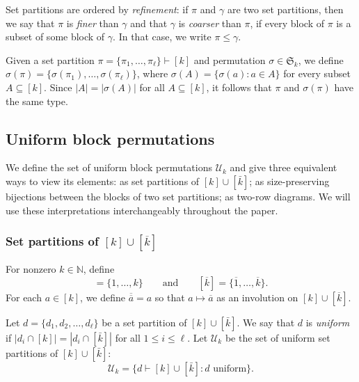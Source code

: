 \documentclass[ALCO,Unicode]{cedram}
\newcommand{\defncolor}{\color{darkred}}
\newcommand{\defn}[1]{{\defncolor\emph{#1}}} %
\begin{document}
Set partitions are ordered by \defn{refinement}: if $\pi$ and $\gamma$ are two set partitions, then we say that $\pi$ is \defn{finer}
than $\gamma$ and that $\gamma$ is \defn{coarser} than $\pi$, if every block of $\pi$ is a subset of some block of $\gamma$. In that case,
we write $\pi\leqslant \gamma$.

Given a set partition $\pi = \{\pi_1, \ldots, \pi_\ell\} \vdash [k]$
and permutation $\sigma \in \mathfrak{S}_k$, we define
$\sigma(\pi) = \{\sigma(\pi_1), \ldots, \sigma(\pi_\ell)\}$,
where $\sigma(A) = \{\sigma(a) : a\in A\}$ for every subset $A \subseteq [k]$.
Since $|A| = |\sigma(A)|$ for all $A \subseteq [k]$, it follows that
$\pi$ and $\sigma(\pi)$ have the same type.

\subsection{Uniform block permutations}
\label{section.UBP}

We define the set of uniform block permutations $\mathcal{U}_k$ and give
three equivalent ways to view its elements:
as set partitions of $[k]\cup [\bar{k}]$;
as size-preserving bijections between the blocks of two set partitions;
as two-row diagrams.
We will use these interpretations interchangeably throughout the paper.

\subsubsection{Set partitions of $[k] \cup [\overline{k}]$}
For nonzero $k\in \mathbb{N}$, define
\begin{equation*}
    [k]= \{1, \dots, k\}
    \qquad\text{and}\qquad
    [\overline{k}] = \{\overline{1}, \ldots, \overline{k}\}.
\end{equation*}
For each $a \in [k]$, we define $\overline{\overline{a}} = a$ so that
$a \mapsto \overline{a}$ as an involution on $[k] \cup [\overline{k}]$.

Let $d = \{d_1, d_2, \ldots, d_\ell\}$ be a set partition of $[k]\cup [\bar{k}]$.
We say that $d$ is \defn{uniform} if
$|d_i\cap [k]|= |d_i\cap [\bar{k}]|$ for all $1\leqslant i\leqslant \ell$.
Let $\mathcal{U}_k$ be the set of uniform set partitions of $[k] \cup [\bar{k}]$:
\[
    \mathcal{U}_k = \big\{ d \vdash [k]\cup[\bar{k}]: \text{$d$ uniform}\big\}.
\]
\end{document}
